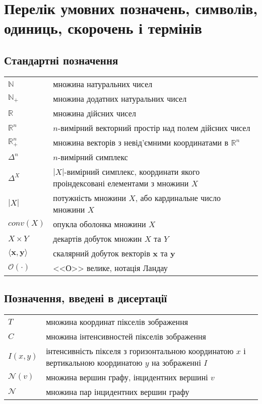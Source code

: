 \chapter*{Перелік умовних позначень, символів, одиниць, скорочень і термінів}

\section*{Стандартні позначення}
\renewcommand{\arraystretch}{0.95}
\noindent\begin{tabular}{ @{}l p{14.7cm} }
 $\mathbb{N}$                       & множина натуральних чисел \\
 $\mathbb{N}_+$                     & множина додатних натуральних чисел \\
 $\mathbb{R}$                       & множина дійсних чисел \\
 $\mathbb{R}^n$                     & $n$-вимірний векторний простір над полем дійсних чисел \\
 $\mathbb{R}_+^n$                   & множина векторів з невід'ємними координатами в $\mathbb{R}^n$ \\
 $\Delta^n$                         & $n$-вимірний симплекс \\
 $\Delta^X$                         & $\left| X \right|$-вимірний симплекс, координати якого проіндексовані елементами з множини $X$ \\
 $\left| X \right| $                & потужність множини $X$, або кардинальне число множини $X$ \\
 $conv \left( X \right)$            & опукла оболонка множини $X$ \\
 $X \times Y$                       & декартів добуток множин $X$ та $Y$ \\
 $\langle \pmb{x}, \pmb{y} \rangle$ & скалярний добуток векторів $\pmb{x}$ та $\pmb{y}$ \\
 $\mathcal{O} \left( \cdot \right)$ & <<О>> велике, нотація Ландау
\end{tabular}

\section*{Позначення, введені в дисертації}
\renewcommand{\arraystretch}{0.95}
\noindent\begin{tabular}{ @{}l p{14.7cm} }
 $T$                            & множина координат пікселів зображення \\
 $C$                            & множина інтенсивностей пікселів зображення \\
 $I \left( x, y \right)$        & інтенсивність пікселя з горизонтальною координатою $x$ і вертикальною координатою $y$ на зображенні $I$ \\
 $\mathcal{N} \left( v \right)$ & множина вершин графу, інцидентних вершині $v$ \\
 $\mathcal{N}$                  & множина пар інцидентних вершин графу
\end{tabular}
